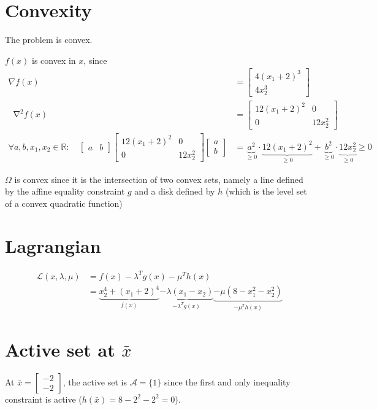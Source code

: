 \documentclass[oneside, a4paper]{book}
\newcommand*\Laplace{\mathop{}\!\mathbin\nabla^2}
\newcommand\br[1]{\left(#1\right)}
\begin{document}
\section{Convexity}
The problem is convex.

$f(x)$ is convex in $x$, since \begin{align*}
    \nabla f(x) &= \begin{bmatrix}
        4(x_1+2)^3\\
        4x_2^3
    \end{bmatrix}\\
    \Laplace f(x) &= \begin{bmatrix}
        12(x_1+2)^2 & 0\\
        0 & 12x_2^2
    \end{bmatrix}\\
    \forall a,b,x_1,x_2\in\mathds{R}:\quad 
    \begin{bmatrix}a & b\end{bmatrix}
    \begin{bmatrix}
        12(x_1+2)^2 & 0\\
        0 & 12x_2^2
    \end{bmatrix}
    \begin{bmatrix}a\\b\end{bmatrix}
    &= 
    \underbrace{a^2}_{\geq 0} \cdot \underbrace{12(x_1+2)^2}_{\geq 0} + \underbrace{b^2}_{\geq 0}\cdot \underbrace{12x_2^2}_{\geq 0} \geq 0 
\end{align*}

$\Omega$ is convex since it is the intersection of two convex sets, namely a line defined by the affine equality constraint $g$ and a disk defined by $h$ (which is the level set of a convex quadratic function)

\section{Lagrangian}
\begin{align*}
    \mathcal{L}\br{x,\lambda,\mu} &= f(x) - \lambda^T g(x) - \mu^T h(x)\\
    &= 
    \underbrace{x_2^4 + \br{x_1+2}^4 }_{f(x)}
    \underbrace{-\lambda\br{x_1 - x_2}}_{- \lambda^T g(x)}
    \underbrace{- \mu\br{8 - x_1^2 - x_2^2}}_{- \mu^T h(x)}
\end{align*}

\section{Active set at $\bar{x}$}
At $\bar{x} = \begin{bmatrix}-2\\-2\end{bmatrix}$, the active set is $\mathcal{A} = \{1\}$ since the first and only inequality constraint is active ($h(\bar{x}) = 8-2^2-2^2=0$).
\end{document}
